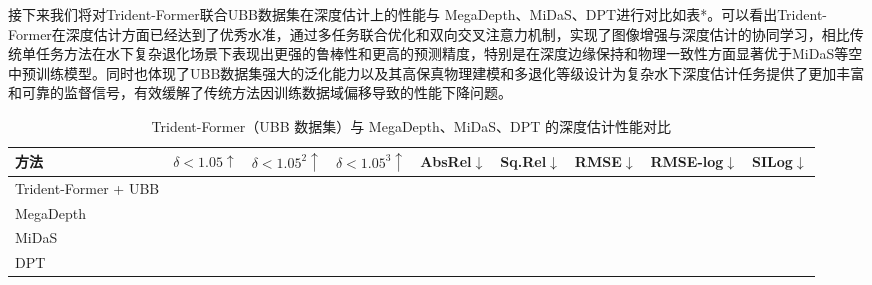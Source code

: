 \documentclass[twocolumn]{article}
\begin{document}
接下来我们将对Trident-Former联合UBB数据集在深度估计上的性能与 MegaDepth、MiDaS、DPT进行对比如表*。可以看出Trident-Former在深度估计方面已经达到了优秀水准，通过多任务联合优化和双向交叉注意力机制，实现了图像增强与深度估计的协同学习，相比传统单任务方法在水下复杂退化场景下表现出更强的鲁棒性和更高的预测精度，特别是在深度边缘保持和物理一致性方面显著优于MiDaS等空中预训练模型。同时也体现了UBB数据集强大的泛化能力以及其高保真物理建模和多退化等级设计为复杂水下深度估计任务提供了更加丰富和可靠的监督信号，有效缓解了传统方法因训练数据域偏移导致的性能下降问题。
\begin{table}[htbp]
  \centering
  \small %
  \setlength{\tabcolsep}{3pt} %
  \caption{Trident-Former（UBB 数据集）与 MegaDepth、MiDaS、DPT 的深度估计性能对比}
  \label{tab:depth_comparison}
  \begin{tabular}{lcccccccc}
    \toprule
    方法 & $\delta<1.05 \uparrow$ & $\delta<1.05^2 \uparrow$ & $\delta<1.05^3 \uparrow$ & AbsRel$\downarrow$ & Sq.Rel$\downarrow$ & RMSE$\downarrow$ & RMSE-log$\downarrow$ & SILog$\downarrow$ \\
    \midrule
    Trident-Former + UBB &   &   &   &   &   &   &   &   \\
    MegaDepth            &   &   &   &   &   &   &   &   \\
    MiDaS                &   &   &   &   &   &   &   &   \\
    DPT                  &   &   &   &   &   &   &   &   \\
    \bottomrule
  \end{tabular}
\end{table}
\end{document}
